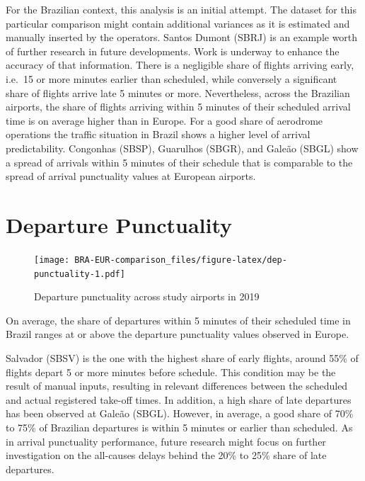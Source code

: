 \documentclass[
]{book}
\begin{document}
For the Brazilian context, this analysis is an initial attempt.
The dataset for this particular comparison might contain additional variances as it is estimated and manually inserted by the operators. Santos Dumont (SBRJ) is an example worth of further research in future developments.
Work is underway to enhance the accuracy of that information.
There is a negligible share of flights arriving early, i.e.~15 or more minutes earlier than scheduled, while conversely a significant share of flights arrive late 5 minutes or more.
Nevertheless, across the Brazilian airports, the share of flights arriving within 5 minutes of their scheduled arrival time is on average higher than in Europe.
For a good share of aerodrome operations the traffic situation in Brazil shows a higher level of arrival predictability.
Congonhas (SBSP), Guarulhos (SBGR), and Galeão (SBGL) show a spread of arrivals within 5 minutes of their schedule that is comparable to the spread of arrival punctuality values at European airports.

\hypertarget{departure-punctuality}{%
\section{Departure Punctuality}\label{departure-punctuality}}



\begin{figure}
\centering
\texttt{[image: BRA-EUR-comparison\_files/figure-latex/dep-punctuality-1.pdf]}
\caption{\label{fig:dep-punctuality}Departure punctuality across study airports in 2019}
\end{figure}

On average, the share of departures within 5 minutes of their scheduled time in Brazil ranges at or above the departure punctuality values observed in Europe.

Salvador (SBSV) is the one with the highest share of early flights, around 55\% of flights depart 5 or more minutes before schedule. This condition may be the result of manual inputs, resulting in relevant differences between the scheduled and actual registered take-off times.
In addition, a high share of late departures has been observed at Galeão (SBGL). However, in average, a good share of 70\% to 75\% of Brazilian departures is within 5 minutes or earlier than scheduled.
As in arrival punctuality performance, future research might focus on further investigation on the all-causes delays behind the 20\% to 25\% share of late departures.
\end{document}

